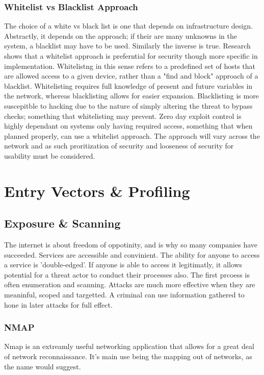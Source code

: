 \subsection{Whitelist vs Blacklist Approach}
The choice of a white vs black list is one that depends on infrastructure design. Abstractly, it depends on the approach; if their are many unknowns in the system, a blacklist may have to be used. 
Similarly the inverse is true. Research shows that a whitelist approach is preferntial for security though more specific in implementation. Whitelistng in this sense refers to a predefined set of hosts
that are allowed access to a given device, rather than a "find and block" approach of a blacklist. Whitelisting requires full knowledge of present and future variables in the network, whereas blacklisting
allows for easier expansion. Blacklisting is more suscepitble to hacking due to the nature of simply altering the threat to bypass checks; something that whitelisting may prevent. Zero day exploit control is 
highly dependant on systems only having required access, something that when planned properly, can use a whitelist approach. The approach will vary across the network and as such proritization of security 
and looseness of security for usability must be considered.



\chapter{Entry Vectors \& Profiling}
\section{Exposure \& Scanning}
The internet is about freedom of oppotinity, and is why so many companies have succeeded. Services are accessible and convinient. The ability for anyone to access a service is 'double-edged'.
If anyone is able to access it legitimatly, it allows potential for a threat actor to conduct their processes also. The first prcoess is often enumeration and scanning. Attacks are much more effective when they are meaninful, scoped and targetted.
A criminal can use information gathered to hone in later attacks for full effect.  

\subsection{NMAP}
Nmap is an extreamly useful networking application that allows for a great deal of network reconnaissance. It's main use being the mapping out of networks, as the name would suggest.

